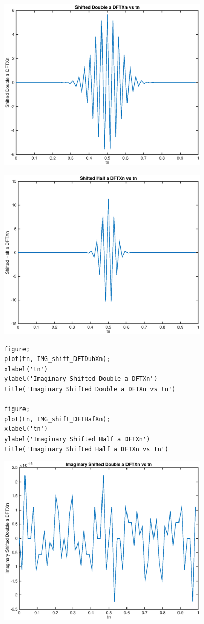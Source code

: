\documentclass{article}
\begin{document}
\includegraphics [width=4in]{untitled_08.eps}

\includegraphics [width=4in]{untitled_09.eps}
\begin{verbatim}
figure;
plot(tn, IMG_shift_DFTDubXn);
xlabel('tn')
ylabel('Imaginary Shifted Double a DFTXn')
title('Imaginary Shifted Double a DFTXn vs tn')

figure;
plot(tn, IMG_shift_DFTHafXn);
xlabel('tn')
ylabel('Imaginary Shifted Half a DFTXn')
title('Imaginary Shifted Half a DFTXn vs tn')
\end{verbatim}

\includegraphics [width=4in]{untitled_10.eps}
\end{document}
